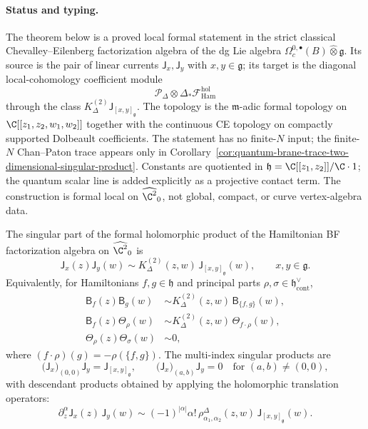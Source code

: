 \paragraph{Status and typing.}
The theorem below is a proved local formal statement in the strict
classical Chevalley--Eilenberg factorization algebra of the dg Lie
algebra
\(\Omega_c^{0,\bullet}(B)\widehat\otimes\mathfrak g\).  Its source is
the pair of linear currents
\(\mathsf J_x,\mathsf J_y\) with \(x,y\in\mathfrak g\); its target is the
diagonal local-cohomology coefficient module
\[
  \mathcal P_\Delta\otimes\Delta_*
  \mathcal F_{\mathrm{Ham}}^{\mathrm{hol}}
\]
through the class
\(K^{(2)}_\Delta\mathsf J_{[x,y]_{\mathfrak g}}\).  The topology is the
\(\mathfrak m\)-adic formal topology on
\(\C[[z_1,z_2,w_1,w_2]]\) together with the continuous CE topology on
compactly supported Dolbeault coefficients.  The statement has no
finite-\(N\) input; the finite-\(N\) Chan--Paton trace appears only in
Corollary~\ref{cor:quantum-brane-trace-two-dimensional-singular-product}.  Constants
are quotiented in
\(\mathfrak h=\C[[z_1,z_2]]/\C\cdot1\); the quantum scalar line is added
explicitly as a projective contact term.  The construction is formal
local on \(\widehat{\C^2}_0\), not global, compact, or curve
vertex-algebra data.

\begin{thm}
\label{thm:formal-two-dimensional-holomorphic-singular-product}
The singular part of the formal holomorphic product of the Hamiltonian BF
factorization algebra on \(\widehat{\C^2}_0\) is
\[
  \mathsf{J}_x(z)\mathsf{J}_y(w)
  \sim
  K^{(2)}_\Delta(z,w)\,\mathsf{J}_{[x,y]_{\mathfrak g}}(w),
  \qquad x,y\in\mathfrak g .
\]
Equivalently, for Hamiltonians \(f,g\in\mathfrak h\) and principal
parts \(\rho,\sigma\in\mathfrak h^\vee_{\mathrm{cont}}\),
\[
\begin{aligned}
  \mathsf{B}_f(z)\mathsf{B}_g(w)
  &\sim
  K^{(2)}_\Delta(z,w)\,\mathsf{B}_{\{f,g\}}(w),\\
  \mathsf{B}_f(z)\mathsf{\Theta}_\rho(w)
  &\sim
  K^{(2)}_\Delta(z,w)\,\mathsf{\Theta}_{f\cdot\rho}(w),\\
  \mathsf{\Theta}_\rho(z)\mathsf{\Theta}_\sigma(w)
  &\sim 0,
\end{aligned}
\]
where \((f\cdot\rho)(g)=-\rho(\{f,g\})\).  The multi-index singular
products are
\[
  \bigl(\mathsf{J}_x\bigr)_{(0,0)}\mathsf{J}_y
  =
  \mathsf{J}_{[x,y]_{\mathfrak g}},
  \qquad
  \bigl(\mathsf{J}_x\bigr)_{(a,b)}\mathsf{J}_y=0
  \quad\text{for }(a,b)\ne(0,0),
\]
with descendant products obtained by applying the holomorphic
translation operators:
\[
  \partial_z^\alpha\mathsf{J}_x(z)\,\mathsf{J}_y(w)
  \sim
  (-1)^{|\alpha|}\alpha!\,
  \rho^\Delta_{\alpha_1,\alpha_2}(z,w)\,
  \mathsf{J}_{[x,y]_{\mathfrak g}}(w).
\]
\end{thm}

